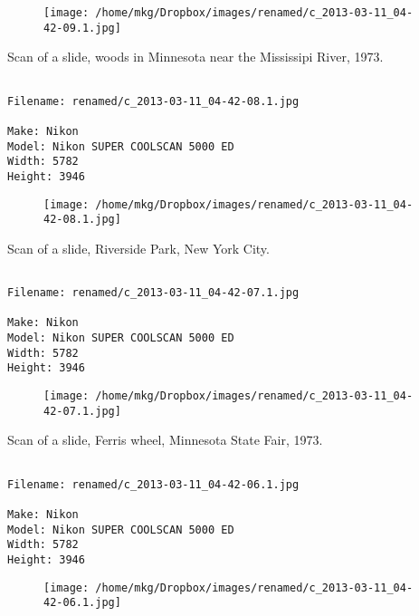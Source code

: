 \begin{figure}
\texttt{[image: /home/mkg/Dropbox/images/renamed/c\_2013-03-11\_04-42-09.1.jpg]}
\end{figure}
    
\clearpage
\onecolumn
\noindent Scan of a slide, woods in Minnesota near the Mississipi River, 1973.
\noindent
\begin{lstlisting}

Filename: renamed/c_2013-03-11_04-42-08.1.jpg

Make: Nikon
Model: Nikon SUPER COOLSCAN 5000 ED
Width: 5782
Height: 3946
\end{lstlisting}
\clearpage

\begin{figure}
\texttt{[image: /home/mkg/Dropbox/images/renamed/c\_2013-03-11\_04-42-08.1.jpg]}
\end{figure}
    
\clearpage
\onecolumn
\noindent Scan of a slide, Riverside Park, New York City.
\noindent
\begin{lstlisting}

Filename: renamed/c_2013-03-11_04-42-07.1.jpg

Make: Nikon
Model: Nikon SUPER COOLSCAN 5000 ED
Width: 5782
Height: 3946
\end{lstlisting}
\clearpage

\begin{figure}
\texttt{[image: /home/mkg/Dropbox/images/renamed/c\_2013-03-11\_04-42-07.1.jpg]}
\end{figure}
    
\clearpage
\onecolumn
\noindent Scan of a slide, Ferris wheel, Minnesota State Fair, 1973.
\noindent
\begin{lstlisting}

Filename: renamed/c_2013-03-11_04-42-06.1.jpg

Make: Nikon
Model: Nikon SUPER COOLSCAN 5000 ED
Width: 5782
Height: 3946
\end{lstlisting}
\clearpage

\begin{figure}
\texttt{[image: /home/mkg/Dropbox/images/renamed/c\_2013-03-11\_04-42-06.1.jpg]}
\end{figure}
    
